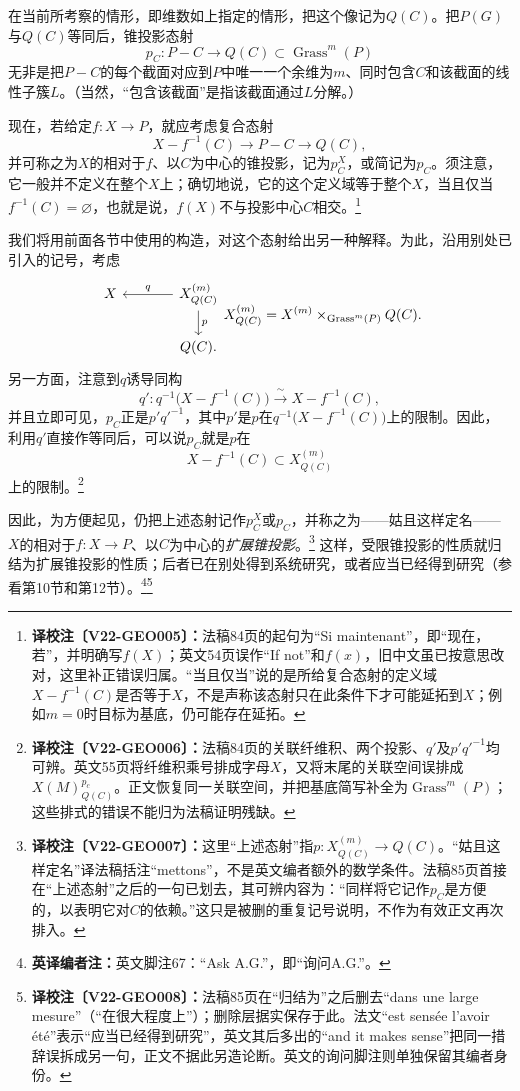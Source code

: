 \documentclass[UTF8,a4paper]{ctexbook}
\newcommand{\cmt}[2]{\footnote{\textbf{译校注〔#1〕：}#2}}
\newcommand{\ednote}[1]{\footnote{\textbf{英译编者注：}#1}}
\begin{document}
在当前所考察的情形，即维数如上指定的情形，把这个像记为$Q(C)$。把$P(G)$与$Q(C)$等同后，锥投影态射
\[
p_C:P-C\longrightarrow Q(C)\subset\operatorname{Grass}^{m}(P)
\]
无非是把$P-C$的每个截面对应到$P$中唯一一个余维为$m$、同时包含$C$和该截面的线性子簇$L$。（当然，“包含该截面”是指该截面通过$L$分解。）

现在，若给定$f:X\to P$，就应考虑复合态射
\[
X-f^{-1}(C)\longrightarrow P-C\longrightarrow Q(C),
\]
并可称之为$X$的相对于$f$、以$C$为中心的锥投影，记为$p_C^X$，或简记为$p_C$。须注意，它一般并不定义在整个$X$上；确切地说，它的这个定义域等于整个$X$，当且仅当$f^{-1}(C)=\varnothing$，也就是说，$f(X)$不与投影中心$C$相交。\cmt{V22-GEO005}{法稿84页的起句为“Si maintenant”，即“现在，若”，并明确写$f(X)$；英文54页误作“If not”和$f(x)$，旧中文虽已按意思改对，这里补正错误归属。“当且仅当”说的是所给复合态射的定义域$X-f^{-1}(C)$是否等于$X$，不是声称该态射只在此条件下才可能延拓到$X$；例如$m=0$时目标为基底，仍可能存在延拓。}

我们将用前面各节中使用的构造，对这个态射给出另一种解释。为此，沿用别处已引入的记号，考虑
\[
\begin{tikzcd}[column sep=large]
X & X^{(m)}_{Q(C)}\arrow[l,"q"']\arrow[d,"p"]\\
  & Q(C).
\end{tikzcd}
\qquad
X^{(m)}_{Q(C)}
 =X^{(m)}\times_{\operatorname{Grass}^{m}(P)}Q(C).
\]
另一方面，注意到$q$诱导同构
\[
q':q^{-1}\bigl(X-f^{-1}(C)\bigr)
 \xrightarrow{\ \sim\ }X-f^{-1}(C),
\]
并且立即可见，$p_C$正是$p'q'^{-1}$，其中$p'$是$p$在$q^{-1}\bigl(X-f^{-1}(C)\bigr)$上的限制。因此，利用$q'$直接作等同后，可以说$p_C$就是$p$在
\[
X-f^{-1}(C)\subset X^{(m)}_{Q(C)}
\]
上的限制。\cmt{V22-GEO006}{法稿84页的关联纤维积、两个投影、$q'$及$p'q'^{-1}$均可辨。英文55页将纤维积乘号排成字母$X$，又将末尾的关联空间误排成$X(M)^{p_c}_{Q(C)}$。正文恢复同一关联空间，并把基底简写补全为$\operatorname{Grass}^{m}(P)$；这些排式的错误不能归为法稿证明残缺。}

因此，为方便起见，仍把上述态射记作$p_C^X$或$p_C$，并称之为——姑且这样定名——$X$的相对于$f:X\to P$、以$C$为中心的\emph{扩展锥投影}。\cmt{V22-GEO007}{这里“上述态射”指$p:X^{(m)}_{Q(C)}\to Q(C)$。“姑且这样定名”译法稿括注“mettons”，不是英文编者额外的数学条件。法稿85页首接在“上述态射”之后的一句已划去，其可辨内容为：“同样将它记作$p_C$是方便的，以表明它对$C$的依赖。”这只是被删的重复记号说明，不作为有效正文再次排入。}
这样，受限锥投影的性质就归结为扩展锥投影的性质；后者已在别处得到系统研究，或者应当已经得到研究（参看第10节和第12节）。\ednote{英文脚注67：“Ask A.G.”，即“询问A.G.”。}\cmt{V22-GEO008}{法稿85页在“归结为”之后删去“dans une large mesure”（“在很大程度上”）；删除层据实保存于此。法文“est sensée l'avoir été”表示“应当已经得到研究”，英文其后多出的“and it makes sense”把同一措辞误拆成另一句，正文不据此另造论断。英文的询问脚注则单独保留其编者身份。}
\end{document}
